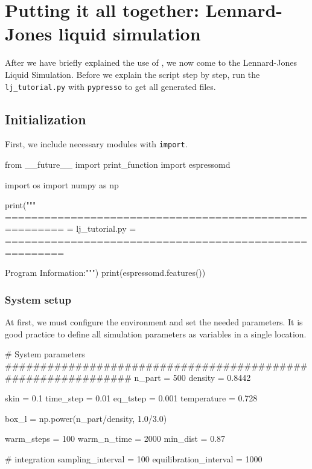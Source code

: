 \documentclass[
paper=a4,                       %
fontsize=11pt,                  %
twoside,                        %
footsepline,                    %
headsepline,                    %
headinclude=false,              %
footinclude=false,              %
pagesize,                       %
]{scrartcl}
\begin{document}
\section{Putting it all together: Lennard-Jones liquid simulation}

After we have briefly explained the use of \es{}, we now come to the
Lennard-Jones Liquid Simulation.  Before we explain the script step by step, run the
\texttt{lj\_tutorial.py}  with \texttt{pypresso} to get all generated files.


\subsection{Initialization}

First, we include necessary modules with \lstinline|import|.
{\small\vspace{0,2cm}
\begin{pypresso}
from __future__ import print_function
import espressomd

import os 
import numpy as np

print("""
=======================================================
=                    lj_tutorial.py                   =
=======================================================

Program Information:""")
print(espressomd.features())

\end{pypresso}\vspace{0,2cm}

\subsubsection{System setup}
At first, we must configure the environment and set the needed parameters.
It is good practice to define all simulation parameters as variables in a single location.
{\small\vspace{0,2cm}
\begin{pypresso}
# System parameters
#############################################################
n_part  = 500
density = 0.8442

skin        = 0.1
time_step   = 0.01 
eq_tstep    = 0.001
temperature = 0.728

box_l       = np.power(n_part/density, 1.0/3.0) 

warm_steps  = 100
warm_n_time = 2000
min_dist    = 0.87

# integration
sampling_interval       = 100
equilibration_interval  = 1000


\end{pypresso}}}
\end{document}
